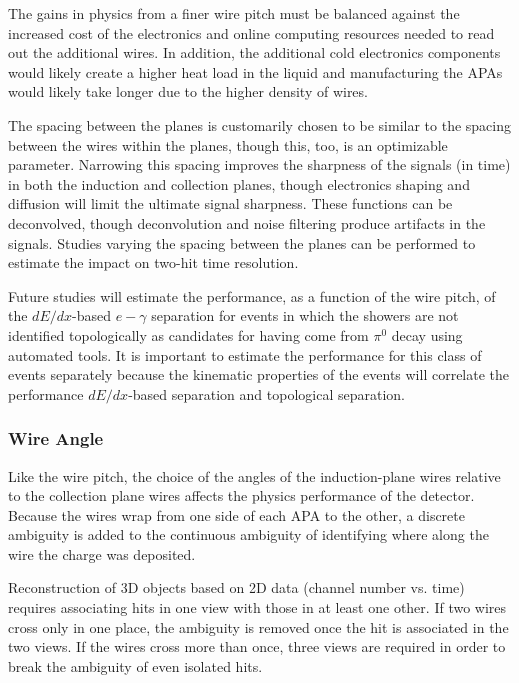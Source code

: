 The gains in physics from a finer wire pitch must be balanced against
the increased cost of the electronics and online computing resources
needed to read out the additional wires.  In addition, the additional
cold electronics components would likely create a higher heat load in
the liquid and manufacturing the APAs would likely take longer due to
the higher density of wires.

The spacing between the planes is customarily chosen to be similar to
the spacing between the wires within the planes, though this, too, is
an optimizable parameter.  Narrowing this spacing improves the
sharpness of the signals (in time) in both the induction and
collection planes, though electronics shaping and diffusion will limit
the ultimate signal sharpness.  These functions can be deconvolved,
though deconvolution and noise filtering produce artifacts in the
signals.  Studies varying the spacing between the planes can be
performed to estimate the impact on two-hit time resolution.

Future studies will estimate the performance, as a function of the
wire pitch, of the $dE/dx$-based $e-\gamma$ separation for events in
which the showers are not identified topologically as candidates for
having come from $\pi^0$ decay using automated tools.  It is important
to estimate the performance for this class of events separately
because the kinematic properties of the events will correlate the
performance $dE/dx$-based separation and topological separation.

\subsubsection{Wire Angle}
\label{v4:fd-ref-wireangle}

Like the wire pitch, the choice of the angles of the induction-plane
wires relative to the collection plane wires affects the physics
performance of the detector.  Because the wires wrap from one side of
each APA to the other, a discrete ambiguity is added to the
continuous ambiguity of identifying where along the wire the charge was deposited.

Reconstruction of 3D objects based on 2D data (channel number
vs. time) requires associating hits in one view with those in at least
one other.  If two wires cross only in one place, the ambiguity is
removed once the hit is associated in the two views.  If the wires
cross more than once, three views are required in order to break the
ambiguity of even isolated hits.

